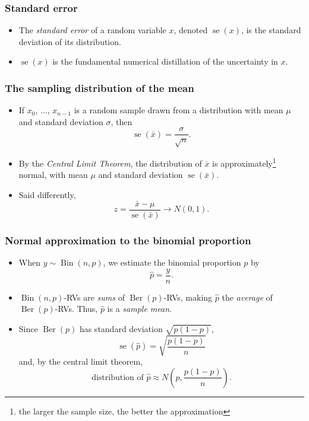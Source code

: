\documentclass{beamer}
\DeclareMathOperator{\stderr}{se}
\DeclareMathOperator{\Ber}{Ber}
\DeclareMathOperator{\Bin}{Bin}
\begin{document}
\begin{frame}
    \frametitle{Standard error}
    
    \begin{itemize}
        \item The \emph{standard error} of a random variable $x$, denoted $\stderr(x)$, is the standard deviation of its distribution.
        \item $\stderr(x)$ is the fundamental numerical distillation of the uncertainty in $x$.
    \end{itemize}
\end{frame}
\begin{frame}
    \frametitle{The sampling distribution of the mean}

    \begin{itemize}
        \item If $x_0$, $\ldots$, $x_{n - 1}$ is a random sample drawn from
        a distribution with mean $\mu$ and standard deviation $\sigma$, then
        \[
            \stderr(\bar{x}) = \frac{\sigma}{\sqrt{n}}.
        \]
        \item By the \emph{Central Limit Theorem}, the distribution of $\bar{x}$
        is approximately\footnote{the larger the sample size, the better the approximation} normal, with mean $\mu$ and standard deviation $\stderr(\bar{x})$.

        \item Said differently,
        \[
        z = \frac{\bar{x}-\mu}{\stderr(\bar{x})}\longrightarrow N(0, 1).
        \]

    \end{itemize}
\end{frame}

\begin{frame}
    \frametitle{Normal approximation to the binomial proportion}

    \begin{itemize}
        \item When $y\sim \Bin(n, p)$, we estimate the binomial proportion $p$ by
        \[
        \hat{p} = \frac{y}{n}.
        \]

        \item $\Bin(n, p)$-RVs are \emph{sums} of $\Ber(p)$-RVs, making $\hat{p}$
        the \emph{average} of $\Ber(p)$-RVs. Thus, $\hat{p}$ is a \emph{sample mean}.
        
        \item Since $\Ber(p)$ has standard deviation $\sqrt{p(1-p)}$,
        \[
        \stderr(\hat{p}) = \sqrt{\frac{p(1-p)}{n}}
        \]
        and, by the central limit theorem,
        \[
        \text{distribution of $\hat{p}$}\approx
        N\left(p, \frac{p(1-p)}{n}\right).
        \]
    \end{itemize}
\end{frame}
\end{document}
